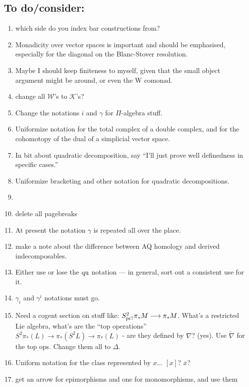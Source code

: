 \documentclass[11pt]{amsart}
\theoremstyle{plain}
\theoremstyle{definition}
\renewcommand{\to}{\longrightarrow}
\newcommand{\squishlist}{
  \setlength{\itemsep}{.5pt}
  \setlength{\parskip}{0pt}
  \setlength{\parsep}{0pt}}
\newcommand{\calW}{\mathcal{W}}
\newcommand{\calK}{\mathcal{K}}
\theoremstyle{plain}
\newcommand{\quadratic}{\textup{qu}}
\begin{document}
\begin{todolist}
\section{\textbf{To do/consider:}}
\begin{enumerate}\squishlist
\setlength{\parindent}{.25in}
\item which side do you index bar constructions from?
\item Monadicity over vector spaces is important and should be emphasised, especially for the diagonal on the Blanc-Stover resolution.
\item Maybe I should keep finiteness to myself, given that the small object argument might be around, or even the W comonad.
\item change all $\calW$'s to $\calK$'s?
\item Change the notations $i$ and $\gamma$ for $\Pi$-algebra stuff.
\item Uniformize notation for the total complex of a double complex, and for the cohomotopy of the dual of a simplicial vector space.
\item In bit about quadratic decomposition, say ``I'll just prove well definedness in specific cases.''
\item Uniformize bracketing and other notation for quadratic decompositions.
\item %
\item delete all pagebreaks
\item At present the notation $\gamma$ is repeated all over the place.
\item make a note about the difference between AQ homology and derived indecomposables.
\item Either use or lose the $\quadratic$ notation --- in general, sort out a consistent use for it.
\item $\gamma_i$ and $\gamma^i$ notations must go.
\item Need a cogent section on stuff like: $S^2_\textup{pr?}\pi_*M\to \pi_*M$. What's a restricted Lie algebra, what's are the ``top operations'' $S^2\pi_*(L)\to \pi_*(S^2L)\to \pi_*(L)$ - are they defined by $\nabla$? (yes). Use $\widetilde{\nabla}$ for the top ops. Change them all to $\Delta$.
\item Uniform notation for the class represented by $x$... $[x]$? $\overline{x}$?
\item get an arrow for epimorphisms and one for monomorphisms, and use them

\end{enumerate}
\end{todolist}
\end{document}
